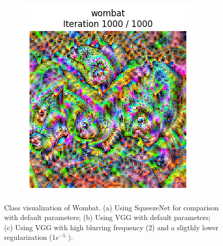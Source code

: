 \begin{figure}[H]
\begin{subfigure}{.32\textwidth}
        \caption{}
        \label{fig:class_viz_wombat_VGG:b}
    \end{subfigure}%
    \begin{subfigure}{.32\textwidth}
        \centering
        \includegraphics[width=\linewidth]{VGG/VGG_wombat_animated_1000_regpp_blur_last_frame.png}
        \caption{}
        \label{fig:class_viz_wombat_VGG:c}
    \end{subfigure}
    \caption{Class visualization of Wombat. (a) Using SqueezeNet for comparison with default parameters; (b) Using VGG with default parameters; (c) Using VGG with high blurring frequency (2) and a sligthly lower regularization ($ 1e^{-5} $ ).}
    \label{fig:class_viz_wombat_VGG}
\end{figure}

